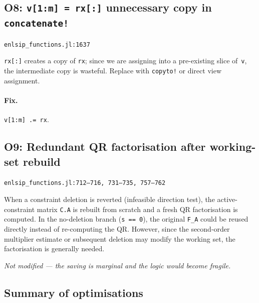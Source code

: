 \documentclass[11pt, a4paper]{article}
\newcommand{\juliaref}[2]{\texttt{#1:#2}}
\begin{document}
\subsection{O8: \texttt{v[1:m] = rx[:]} unnecessary copy in \texttt{concatenate!}}
\label{sec:o8}

\juliaref{enlsip\_functions.jl}{1637}

\texttt{rx[:]} creates a copy of \texttt{rx}; since we are assigning
into a pre-existing slice of~\texttt{v}, the intermediate copy is
wasteful.  Replace with \texttt{copyto!} or direct view assignment.

\paragraph{Fix.}
\texttt{v[1:m] .= rx}.

\subsection{O9: Redundant QR factorisation after working-set rebuild}
\label{sec:o9}

\juliaref{enlsip\_functions.jl}{712--716, 731--735, 757--762}

When a constraint deletion is reverted (infeasible direction test),
the active-constraint matrix \texttt{C.A} is rebuilt from scratch and
a fresh QR factorisation is computed.  In the no-deletion branch
(\texttt{s == 0}), the original \texttt{F\_A} could be reused directly
instead of re-computing the QR.  However, since the second-order
multiplier estimate or subsequent deletion may modify the working set,
the factorisation is generally needed.

\medskip\noindent
\textit{Not modified --- the saving is marginal and the logic would
become fragile.}

\subsection{Summary of optimisations}
\end{document}
